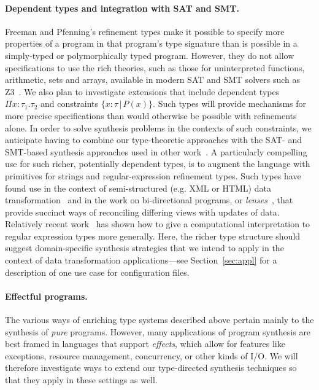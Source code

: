 \paragraph*{Dependent types and integration with SAT and SMT.}
Freeman and Pfenning's refinement types make it possible to
specify more properties of a program in that program's type signature
than is possible in a simply-typed or polymorphically typed program.
However, they do not allow specifications to use the rich
theories, such as those for uninterpreted functions, arithmetic, sets
and arrays, available in modern SAT and SMT solvers such as Z3~\cite{Z3}.
We also plan to investigate extensions that include
dependent types $\Pi x{:}\tau_1.\tau_2$ and constraints $\{x{:}\tau \, | \, P(x)\}$.
Such types will provide mechanisms for more precise specifications
than would otherwise be possible with refinements alone.  In order
to solve synthesis problems in the contexts of such constraints,
we anticipate having to combine our type-theoretic approaches with the
SAT- and SMT-based synthesis approaches used in other 
work~\cite{alur-fmcad-2013,solar-lezama-thesis-2008,vu-pldi-2014}. 
A particularly compelling use for such richer, potentially dependent
types, is to augment the language with primitives for strings and
regular-expression refinement types.  Such types have found use in the
context of semi-structured (e.g. XML or HTML) data
transformation~\cite{hosoya2003xduce,benzaken2003cduce}  and in the work on
bi-directional programs, or \textit{lenses}~\cite{foster2007combinators,bohannon2008boomerang},
that provide succinct ways of reconciling differing views with updates
of data.  Relatively recent work~\cite{henglein2011regular} has shown how to give a computational interpretation to
regular expression types more generally.  Here, the richer type
structure should suggest domain-specific synthesis strategies that we
intend to apply in the context of data transformation
applications---see Section~\ref{sec:appl} for a description of one use case for 
  configuration files.



\paragraph*{Effectful programs.}

The various ways of enriching type systems described above pertain
mainly to the synthesis of \textit{pure} programs.  However, many
applications of  program synthesis are best framed in languages that
support \textit{effects}, which allow for features like exceptions,
resource management, concurrency, or other kinds of I/O.   We will
therefore investigate ways to extend our type-directed synthesis
techniques so that they apply in these settings as well.

